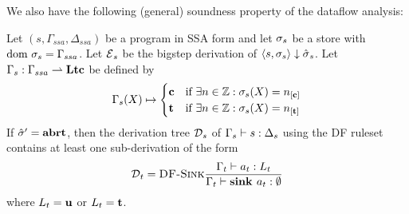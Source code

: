 We also have the following (general) soundness property of the dataflow analysis:
\begin{theorem}
    Let $(s, \Gamma_{ssa}, \Delta_{ssa})$ be a program in SSA form and let $\sigma_s$ be a store
    with $\text{dom }{\sigma}_s = \Gamma_{ssa}$.
    Let $\operatorname{\mathcal{E}}_s$ be the bigstep derivation of $\langle s, \sigma_s \rangle \downarrow \hat{\sigma}{}_s$.
    Let $\Gamma_s: \Gamma_{ssa} \rightharpoonup \textbf{Ltc}$ be defined by
    \begin{align*}
        \Gamma_s(X) \mapsto \begin{cases}
            \lclean & \text{if $\exists n \in \Z: \store_s(X) = \clean$}\\
            \ltracked & \text{if $\exists n \in \Z: \store_s(X) = \tracked{}$}\\
        \end{cases}
    \end{align*}
    If $\hat{\sigma}{}' = \textbf{abrt}$, then
    the derivation tree $\operatorname{\mathcal{D}}_s$ of $\Gamma_{s} \vdash {s}: \Delta_s$ using the DF ruleset
    contains at least one sub-derivation of the form
    \begin{equation*}
        \operatorname{\mathcal{D}}_t = \textsc{DF-Sink}\frac{\displaystyle \Gamma_t \vdash {a_t}: L_t}{\displaystyle \Gamma_t \vdash {\textbf{sink }{a_t}}: \emptyset}
    \end{equation*}
    where $L_t = \textbf{u}$ or $L_t = \textbf{t}$.
\end{theorem}
